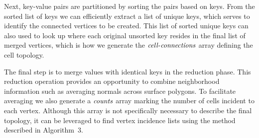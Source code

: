 \documentclass[10pt,journal,cspaper,compsoc]{IEEEtran}
\begin{document}
Next, key-value pairs are partitioned by sorting the pairs based on keys.
From the sorted list of keys we can efficiently extract a list of unique
keys, which serves to identify the connected vertices to be created.  This
list of sorted unique keys can also used to look up where each original
unsorted key resides in the final list of merged vertices, which is how we
generate the $\id{cell-connections}$ array defining the cell topology.

The final step is to merge values with identical keys in the reduction
phase.  This reduction operation provides an opportunity to combine
neighborhood information such as averaging normals across surface polygons.
To facilitate averaging we also generate a $\id{counts}$ array marking
the number of cells incident to each vertex.  Although this array is not
specifically necessary to describe the final topology, it can be leveraged
to find vertex incidence lists using the  method
described in Algorithm~3.


\end{document}
